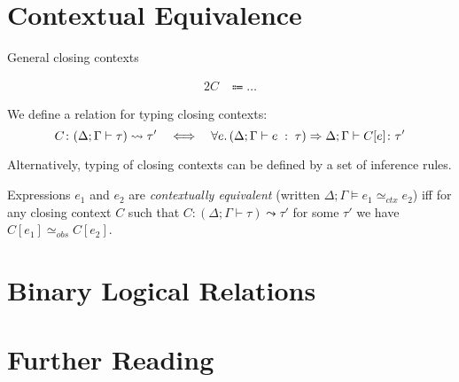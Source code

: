 \section{Contextual Equivalence}

General closing contexts

\begin{alignat*}{2}
  C & \Coloneqq \ldots
\end{alignat*}

We define a relation for typing closing contexts:
\[
  C \colon (\Delta; \Gamma \vdash \tau) \leadsto \tau'
    \quad\Longleftrightarrow\quad
    \forall e\ldotp (\Delta; \Gamma \vdash e \;:\;\tau) \Rightarrow
      \Delta;\Gamma \vdash C[e] \colon \tau'
\]

Alternatively, typing of closing contexts can be defined by
a set of inference rules.

\begin{defin}
  Expressions $e_1$ and $e_2$ are \emph{contextually equivalent}
  (written $\Delta; \Gamma \models e_1 \simeq_{ctx} e_2$)
  iff for any closing context $C$ such that $C : (\Delta;\Gamma\vdash\tau) \leadsto \tau'$
  for some $\tau'$
  we have $C[e_1] \simeq_{obs} C[e_2]$.
\end{defin}

\section{Binary Logical Relations}

\section{Further Reading}
